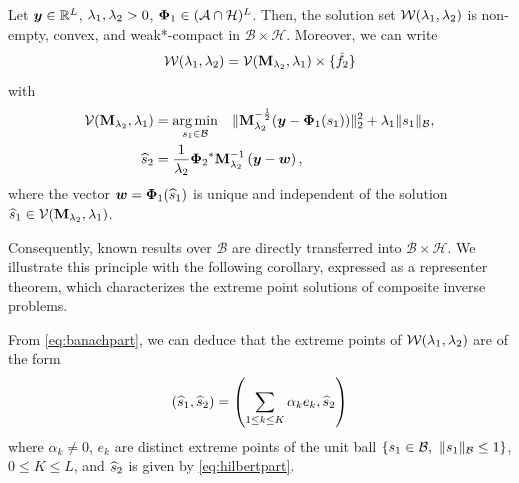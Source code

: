 \documentclass[12pt]{article}
\begin{document}
    \begin{theorem} \label{theo:main}
     Let $\bm{y}\in \mathbb{R}^L$, $\lambda_1, \lambda_{2} > 0$, ${\bm{\Phi}_1} \in (\mathcal{A} \cap \mathcal{H})^L$.
     Then, the solution set $\mathcal{W} (\lambda_{1},\lambda_{2})$
    is non-empty, convex, and weak*-compact in $\mathcal{B}\times \mathcal{H}$. Moreover, we can write
    \begin{equation}
        \label{eq:decoupling}
        \mathcal{W} (\lambda_{1},\lambda_{2}) = \mathcal{V}(\mathbf{M}_{\lambda_{2}},\lambda_{1}) \times \{\hat{f}_2\}
    \end{equation}
    with
    \begin{align}
        \mathcal{V}(\mathbf{M}_{\lambda_{2}},\lambda_{1}) &= \underset{ s_1 \in \mathcal{B}}{\arg\min} \quad \|\mathbf{M}_{\lambda_{2}}^{-\frac{1}{2}} ( \bm{y} - {\bm{\Phi}_1}(s_1)  ) \|_2^2  + \lambda_{1} \| s_1 \|_{\mathcal{B}} , \label{eq:banachpart} \\
        \widehat{s}_2 &=  \frac{1}{\lambda_{2}}{\bm{\Phi}_2}^* \mathbf{M}_{\lambda_{2}}^{-1} \left(\bm{y} - \bm{w}\right), \label{eq:hilbertpart}
    \end{align}
    where the vector $\bm{w} = {\bm{\Phi}_1} ( \widehat{s}_1)$ is unique and independent of the solution $\widehat{s}_1 \in \mathcal{V}(\mathbf{M}_{\lambda_{2}},\lambda_{1})$. 
    \end{theorem}

    Consequently, known results over $\mathcal{B}$ are directly transferred into $\mathcal{B}\times \mathcal{H}$. We illustrate this principle with the following corollary, expressed as a representer theorem, which characterizes the extreme point solutions of composite inverse problems.

    \begin{corollary}
    From \eqref{eq:banachpart}, we can deduce that the extreme points of $\mathcal{W} (\lambda_{1},\lambda_{2})$ are of the form 
    \begin{equation} \label{eq:extreme}
        (\widehat{s}_1 , \widehat{s}_2 ) = \left( \sum_{1 \leq k \leq K} \alpha_k e_k , \widehat{s}_2 \right)
    \end{equation}
    where $\alpha_k \neq 0$, $e_k$ are distinct extreme points of the unit ball $\{ s_1 \in \mathcal{B}, \ \| s_1 \|_{\mathcal{B}} \leq 1\}$, $0 \leq K \leq L$, and $\widehat{s}_2$ is given by \eqref{eq:hilbertpart}. 
    \end{corollary}
\end{document}
